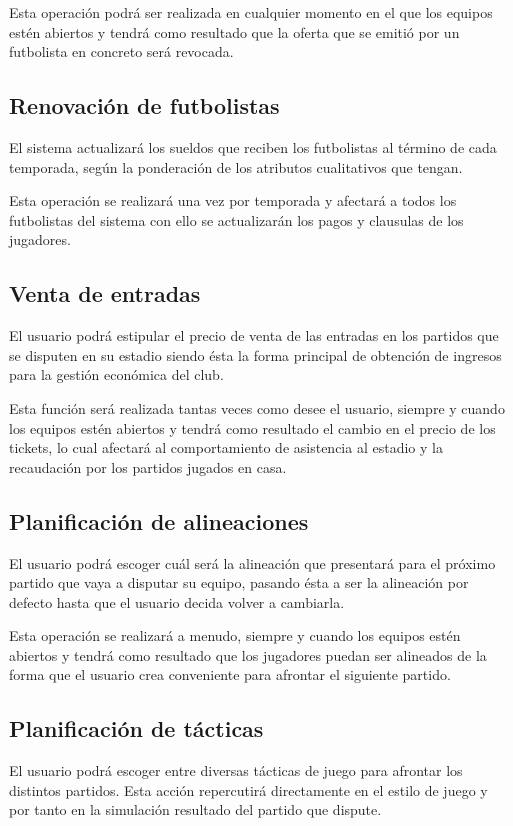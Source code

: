 Esta operación podrá ser realizada en cualquier momento en el que los equipos
estén abiertos y tendrá como resultado que la oferta que se emitió por un
futbolista en concreto será revocada.

\subsection*{Renovación de futbolistas}
El sistema actualizará los sueldos que reciben los futbolistas al término de
cada temporada, según la ponderación de los atributos cualitativos que tengan.

Esta operación se realizará una vez por temporada y afectará a todos los
futbolistas del sistema con ello se actualizarán los pagos y clausulas de los jugadores.
\subsection*{Venta de entradas}
El usuario podrá estipular el precio de venta de las entradas en los partidos
que se disputen en su estadio siendo ésta la forma principal de obtención de
ingresos para la gestión económica del club.

Esta función será realizada tantas veces como desee el usuario, siempre y cuando
los equipos estén abiertos y tendrá como
resultado el cambio en el precio de los tickets, lo cual afectará al
comportamiento de asistencia al estadio y la recaudación por los partidos
jugados en casa.

\subsection*{Planificación de alineaciones}
El usuario podrá escoger cuál será la alineación que presentará para el próximo
partido que vaya a disputar su equipo, pasando ésta a ser la alineación por
defecto hasta que el usuario decida volver a cambiarla.

Esta operación se realizará a menudo, siempre y cuando los equipos estén abiertos y tendrá como resultado que los jugadores
puedan ser alineados de la forma que el usuario crea conveniente para afrontar
el siguiente partido.
\subsection*{Planificación de tácticas}
El usuario podrá escoger entre diversas tácticas de juego para afrontar los
distintos partidos. Esta acción repercutirá directamente en el estilo de juego y
por tanto en la simulación resultado del partido que dispute.

